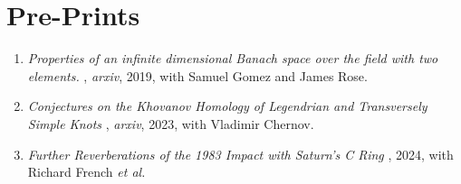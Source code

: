 \documentclass[a4paper,sans]{moderncv}
\begin{document}
    \section{Pre-Prints}
        \begin{enumerate}
            \item
                \textit{%
                    Properties of an infinite dimensional
                    Banach space over the field with two elements.%
                },
                \textit{arxiv}, 2019, with Samuel Gomez and James Rose.
            \item
                \textit{%
                    Conjectures on the Khovanov Homology of
                    Legendrian and Transversely Simple Knots%
                },
                \textit{arxiv}, 2023, with Vladimir Chernov.
            \item
                \textit{%
                    Further Reverberations of the 1983
                    Impact with Saturn’s C Ring
                },
                2024, with Richard French \textit{et al.}
        \end{enumerate}
\end{document}
